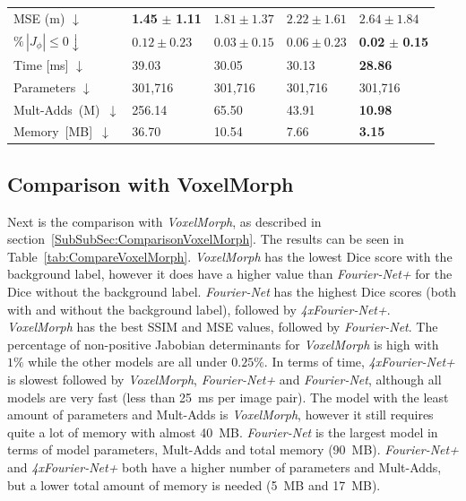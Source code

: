\begin{table}[h]
\begin{tabularx}{\textwidth}{Y Y Y Y Y}
		MSE (m) $\downarrow$ & \textbf{1.45} $\pm$ \textbf{1.11} & $1.81 \pm 1.37$ & $2.22 \pm 1.61$ & $2.64 \pm 1.84$ \\
		$\% \, |J_{\phi}|\leq0 \downarrow$ & $0.12 \pm 0.23$ & $0.03 \pm 0.15$ & $0.06 \pm 0.23$ & \textbf{0.02} $\pm$ \textbf{0.15} \\	
		Time [ms] $\downarrow$ 	 & 39.03  & 30.05  & 30.13  & \textbf{28.86} \\
		Parameters  $\downarrow$	 & 301,716 & 301,716 & 301,716 & 301,716 \\
		\mbox{Mult-Adds (M) $\downarrow$} & 256.14  & 65.50   & 43.91   & \textbf{10.98} \\
		\mbox{Memory [MB]  $\downarrow$} 	 & 36.70   & 10.54   & 7.66    & \textbf{3.15} \\
		\bottomrule
	\end{tabularx}
\end{table}

\subsection{Comparison with VoxelMorph} \label{SubSec:ResultsComparisonVoxelMorph}
Next is the comparison with \emph{VoxelMorph}, as described in section~\ref{SubSubSec:ComparisonVoxelMorph}. The results can be seen in Table~\ref{tab:CompareVoxelMorph}. \emph{VoxelMorph} has the lowest Dice score with the background label, however it does have a higher value than \emph{Fourier-Net+} for the Dice without the background label. \emph{Fourier-Net} has the highest Dice scores (both with and without the background label), followed by \emph{4xFourier-Net+}. \emph{VoxelMorph} has the best SSIM and MSE values, followed by \emph{Fourier-Net}. The percentage of non-positive Jabobian determinants for \emph{VoxelMorph} is high with $1\%$ while the other models are all under $0.25\%$. In terms of time, \emph{4xFourier-Net+} is slowest followed by \emph{VoxelMorph}, \emph{Fourier-Net+} and \emph{Fourier-Net}, although all models are very fast (less than 25~ms per image pair). The model with the least amount of parameters and Mult-Adds is \emph{VoxelMorph}, however it still requires quite a lot of memory with almost 40~MB. \emph{Fourier-Net} is the largest model in terms of model parameters, Mult-Adds and total memory (90~MB). \emph{Fourier-Net+} and \emph{4xFourier-Net+} both have a higher number of parameters and Mult-Adds, but a lower total amount of memory is needed (5~MB and 17~MB). 

